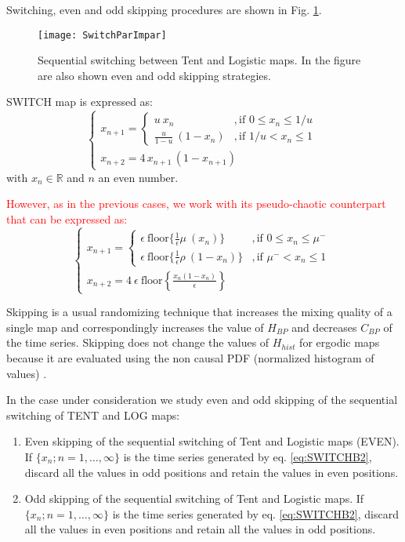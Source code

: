 Switching, even and odd skipping procedures are shown in Fig. \ref{fig:seq}.
%
\begin{figure}[htpb]
\centering	
	\texttt{[image: SwitchParImpar]}
	\caption{Sequential switching between Tent and Logistic maps. In the figure are also shown even and odd skipping strategies.}
	\label{fig:seq}
\end{figure}

SWITCH map is expressed as:
%
\begin{equation}\label{eq:SWITCH}
\begin{cases}
	x_{n+1}=
	\begin{cases}
		u~x_n &, \textrm{if } 0\leq x_n\leq 1/u\\
		\frac{u}{1-u}~(1-x_n) &, \textrm{if } 1/u< x_n\leq 1 
	\end{cases} \\
	x_{n+2}=4\,x_{n+1}\,(1-x_{n+1})
\end{cases}
\end{equation}
%
with $x_n \in \mathbb{R}$ and $n$ an even number.

\textcolor{red}{However, as in the previous cases, we work with its pseudo-chaotic counterpart that can be expressed as:}
%
\begin{equation}\label{eq:SWITCHB2}
\begin{cases}
	x_{n+1}=
	\begin{cases}
		\epsilon ~\text{floor} \{\frac{1}{\epsilon} \mu~(x_n)\} &, \textrm{if } 0\leq x_n\leq \mu^-\\
		\epsilon ~\text{floor} \{\frac{1}{\epsilon} \rho~(1-x_n)\} &, \textrm{if } \mu^-<x_n\leq 1
	\end{cases} \\
	x_{n+2}=4 ~\epsilon ~\text{floor}\left\{\frac{x_n(1-x_n)}{\epsilon}\right\}
\end{cases}
\end{equation}
%

Skipping is a usual randomizing technique that increases the mixing quality of a single map and correspondingly increases the value of $H_{BP}$ and decreases $C_{BP} $ of the time series.
Skipping does not change the values of $H_{hist}$ for ergodic maps because it are evaluated using the non causal PDF (normalized histogram of values) \cite{DeMicco2008}.

In the case under consideration we study even and odd skipping of the sequential switching of TENT and LOG maps:
\begin{enumerate}[leftmargin=*,labelsep=4.9mm]
	\item Even skipping of the sequential switching of Tent and Logistic maps (EVEN).\\
	If $\{x_n; n=1,\dots,\infty\}$ is the time series generated by eq. \eqref{eq:SWITCHB2}, discard all the values in odd positions and retain the values in even positions.
	\item Odd skipping of the sequential switching of Tent and Logistic maps.
	If $\{x_n; n=1,\dots,\infty\}$ is the time series generated by eq. \eqref{eq:SWITCHB2}, discard all the values in even positions and retain all the values in odd positions.
\end{enumerate}

